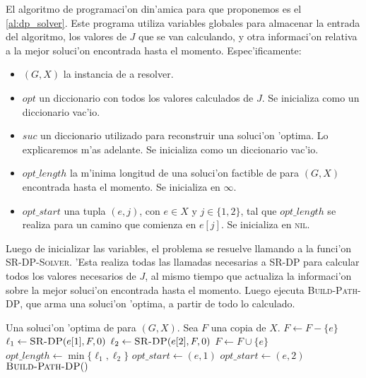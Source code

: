 El algoritmo de programaci'on din'amica para  que proponemos es el \autoref{al:dp_solver}. Este programa utiliza variables globales para almacenar la entrada del algoritmo, los valores de $J$ que se van calculando, y otra informaci'on relativa a la mejor soluci'on encontrada hasta el momento. Espec'ificamente:

\begin{itemize}
\item $(G, X)$ la instancia de  a resolver.
\item $opt$ un diccionario con todos los valores calculados de $J$. Se inicializa como un diccionario vac'io.
\item $suc$ un diccionario utilizado para reconstruir una soluci'on 'optima. Lo explicaremos m'as adelante. Se inicializa como un diccionario vac'io.
\item $opt\_length$ la m'inima longitud de una soluci'on factible de  para $(G, X)$ encontrada hasta el momento. Se inicializa en $\infty$.
\item $opt\_start$ una tupla $(e, j)$, con $e \in X$ y $j \in \{1, 2\}$, tal que $opt\_length$ se realiza para un camino que comienza en $e[j]$. Se inicializa en \textsc{nil}.
\end{itemize}

Luego de inicializar las variables, el problema se resuelve llamando a la funci'on \textsc{SR-DP-Solver}. 'Esta realiza todas las llamadas necesarias a \textsc{SR-DP} para calcular todos los valores necesarios de $J$, al mismo tiempo que actualiza la informaci'on sobre la mejor soluci'on encontrada hasta el momento. Luego ejecuta \textsc{Build-Path-DP}, que arma una soluci'on 'optima, a partir de todo lo calculado.

\begin{algorithm}
  \caption{}
  \label{al:dp_solver}
  \begin{algorithmic}[1]
  	\Ensure Una soluci'on 'optima de  para $(G, X)$.
	\State Sea $F$ una copia de $X$.
		\State $F \gets F - \{e\}$
		\State $\ell_1 \gets \textsc{SR-DP}(e[1], F, 0)$
		\State $\ell_2 \gets \textsc{SR-DP}(e[2], F, 0)$
		\State $F \gets F \cup \{e\}$
			\State $opt\_length \gets \min\{\ell_1, \ell_2\}$
				\State $opt\_start \gets (e, 1)$
			\Else
				\State $opt\_start \gets (e, 2)$			
			\EndIf		
		\EndIf
	\EndFor
	\Return $\textsc{Build-Path-DP}()$
	\EndFunction
  \end{algorithmic}
\end{algorithm}

